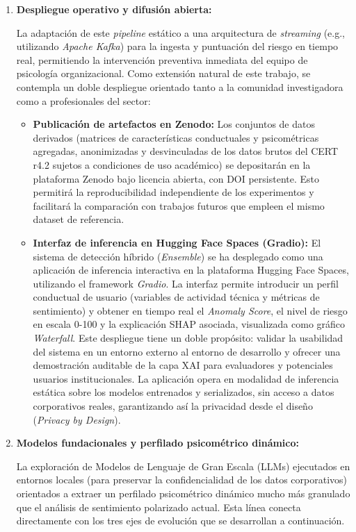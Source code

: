 \documentclass[IB]{TFUOC}%
\begin{document}
\begin{enumerate}
    \item \textbf{Despliegue operativo y difusión abierta:}

    La adaptación de este \textit{pipeline} estático a una arquitectura de \textit{streaming} (e.g., utilizando \textit{Apache Kafka}) para la ingesta y puntuación del riesgo en tiempo real, permitiendo la intervención preventiva inmediata del equipo de psicología organizacional. Como extensión natural de este trabajo, se contempla un doble despliegue orientado tanto a la comunidad investigadora como a profesionales del sector:

\begin{itemize}
    \item \textbf{Publicación de artefactos en Zenodo:} Los conjuntos de datos derivados (matrices de características conductuales y psicométricas agregadas, anonimizadas y desvinculadas de los datos brutos del CERT r4.2 sujetos a condiciones de uso académico) se depositarán en la plataforma Zenodo bajo licencia abierta, con DOI persistente. Esto permitirá la reproducibilidad independiente de los experimentos y facilitará la comparación con trabajos futuros que empleen el mismo dataset de referencia.
    
    \item \textbf{Interfaz de inferencia en Hugging Face Spaces (Gradio):} El sistema de detección híbrido (\textit{Ensemble}) se ha desplegado como una aplicación de inferencia interactiva en la plataforma Hugging Face Spaces, utilizando el framework \textit{Gradio}. La interfaz permite introducir un perfil conductual de usuario (variables de actividad técnica y métricas de sentimiento) y obtener en tiempo real el \textit{Anomaly Score}, el nivel de riesgo en escala 0-100 y la explicación SHAP asociada, visualizada como gráfico \textit{Waterfall}. Este despliegue tiene un doble propósito: validar la usabilidad del sistema en un entorno externo al entorno de desarrollo y ofrecer una demostración auditable de la capa XAI para evaluadores y potenciales usuarios institucionales. La aplicación opera en modalidad de inferencia estática sobre los modelos entrenados y serializados, sin acceso a datos corporativos reales, garantizando así la privacidad desde el diseño (\textit{Privacy by Design}).

\end{itemize}

    \item \textbf{Modelos fundacionales y perfilado psicométrico dinámico:}
    
    La exploración de Modelos de Lenguaje de Gran Escala (LLMs) ejecutados 
    en entornos locales (para preservar la confidencialidad de los datos 
    corporativos) orientados a extraer un perfilado psicométrico dinámico 
    mucho más granulado que el análisis de sentimiento polarizado actual. 
    Esta línea conecta directamente con los tres ejes de evolución que se 
    desarrollan a continuación.

\end{enumerate}
\end{document}
